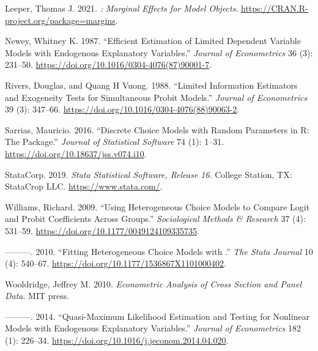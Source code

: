 \begin{CSLReferences}{1}{0}
\leavevmode{}%
Leeper, Thomas J. 2021. \emph{: Marginal Effects for Model Objects}. \url{https://CRAN.R-project.org/package=margins}.

\leavevmode{}%
Newey, Whitney K. 1987. {``Efficient Estimation of Limited Dependent Variable Models with Endogenous Explanatory Variables.''} \emph{Journal of Econometrics} 36 (3): 231--50. \url{https://doi.org/10.1016/0304-4076(87)90001-7}.

\leavevmode{}%
Rivers, Douglas, and Quang H Vuong. 1988. {``Limited Information Estimators and Exogeneity Tests for Simultaneous Probit Models.''} \emph{Journal of Econometrics} 39 (3): 347--66. \url{https://doi.org/10.1016/0304-4076(88)90063-2}.

\leavevmode{}%
Sarrias, Mauricio. 2016. {``Discrete Choice Models with Random Parameters in {R}: The  Package.''} \emph{Journal of Statistical Software} 74 (1): 1--31. \url{https://doi.org/10.18637/jss.v074.i10}.

\leavevmode{}%
StataCorp. 2019. \emph{Stata Statistical Software, Release 16}. College Station, TX: StataCrop LLC. \url{https://www.stata.com/}.

\leavevmode{}%
Williams, Richard. 2009. {``{Using Heterogeneous Choice Models to Compare Logit and Probit Coefficients Across Groups}.''} \emph{Sociological Methods \& Research} 37 (4): 531--59. \url{https://doi.org/10.1177/0049124109335735}.

\leavevmode{}%
---------. 2010. {``Fitting Heterogeneous Choice Models with .''} \emph{The Stata Journal} 10 (4): 540--67. \url{https://doi.org/10.1177/1536867X1101000402}.

\leavevmode{}%
Wooldridge, Jeffrey M. 2010. \emph{{Econometric Analysis of Cross Section and Panel Data}}. MIT press.

\leavevmode{}%
---------. 2014. {``{Quasi-Maximum Likelihood Estimation and Testing for Nonlinear Models with Endogenous Explanatory Variables}.''} \emph{Journal of Econometrics} 182 (1): 226--34. \url{https://doi.org/10.1016/j.jeconom.2014.04.020}.


\end{CSLReferences}
